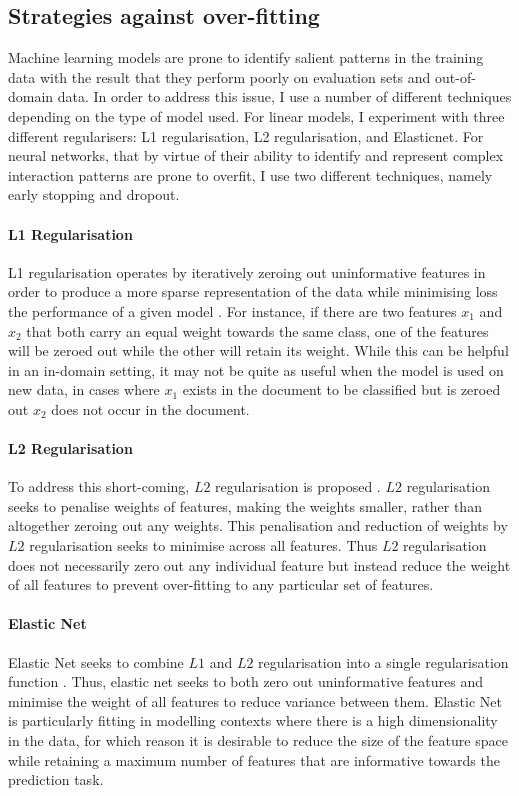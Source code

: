 \subsection{Strategies against over-fitting}\label{sec:anti-overfit}

Machine learning models are prone to identify salient patterns in the training data with the result that they perform poorly on evaluation sets and out-of-domain data. In order to address this issue, I use a number of different techniques depending on the type of model used.
For linear models, I experiment with three different regularisers: L1 regularisation, L2 regularisation, and Elasticnet.
For neural networks, that by virtue of their ability to identify and represent complex interaction patterns are prone to overfit, I use two different techniques, namely early stopping and dropout.

\paragraph*{L1 Regularisation} L1 regularisation operates by iteratively zeroing out uninformative features in order to produce a more sparse representation of the data while minimising loss the performance of a given model \citep{L1 regularisation paper}. For instance, if there are two features $x_1$ and $x_2$ that both carry an equal weight towards the same class, one of the features will be zeroed out while the other will retain its weight. While this can be helpful in an in-domain setting, it may not be quite as useful when the model is used on new data, in cases where $x_1$ exists in the document to be classified but is zeroed out $x_2$ does not occur in the document.

\paragraph*{L2 Regularisation} To address this short-coming, $L2$ regularisation is proposed \citep{L2 regularisation paper}. $L2$ regularisation seeks to penalise weights of features, making the weights smaller, rather than altogether zeroing out any weights. This penalisation and reduction of weights by $L2$ regularisation seeks to minimise across all features. Thus $L2$ regularisation does not necessarily zero out any individual feature but instead reduce the weight of all features to prevent over-fitting to any particular set of features.

\paragraph*{Elastic Net} Elastic Net seeks to combine $L1$ and $L2$ regularisation into a single regularisation function \citep{Elastic net paper}. Thus, elastic net seeks to both zero out uninformative features and minimise the weight of all features to reduce variance between them. Elastic Net is particularly fitting in modelling contexts where there is a high dimensionality in the data, for which reason it is desirable to reduce the size of the feature space while retaining a maximum number of features that are informative towards the prediction task.

